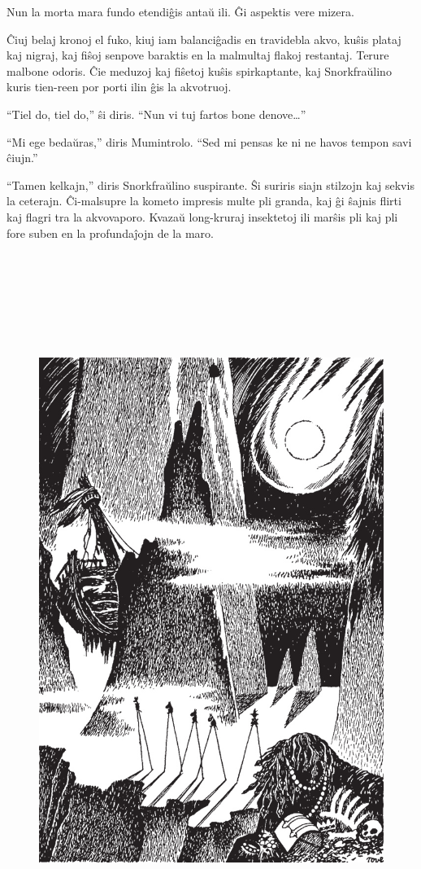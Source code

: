 Nun la morta mara fundo etendiĝis antaŭ ili. Ĝi aspektis vere mizera.

Ĉiuj belaj kronoj el fuko, kiuj iam balanciĝadis en travidebla akvo, kuŝis plataj kaj nigraj, kaj fiŝoj senpove baraktis en la malmultaj flakoj restantaj. Terure malbone odoris. Ĉie meduzoj kaj fiŝetoj kuŝis spirkaptante, kaj Snorkfraŭlino kuris tien-reen por porti ilin ĝis la akvotruoj.

``Tiel do, tiel do,'' ŝi diris. ``Nun vi tuj fartos bone denove{\ldots}''

``Mi ege bedaŭras,'' diris Mumintrolo. ``Sed mi pensas ke ni ne havos tempon savi ĉiujn.''

``Tamen kelkajn,'' diris Snorkfraŭlino suspirante. Ŝi suriris siajn stilzojn kaj sekvis la ceterajn. Ĉi-malsupre la kometo impresis multe pli granda, kaj ĝi ŝajnis flirti kaj flagri tra la akvovaporo. Kvazaŭ long-kruraj insektetoj ili marŝis pli kaj pli fore suben en la profundaĵojn de la maro.

\begin{figure}[htbp]
\centering
\includegraphics[width=449pt,height=658pt]{7-4.png}
\caption{}
\label{7-4}
\end{figure}

